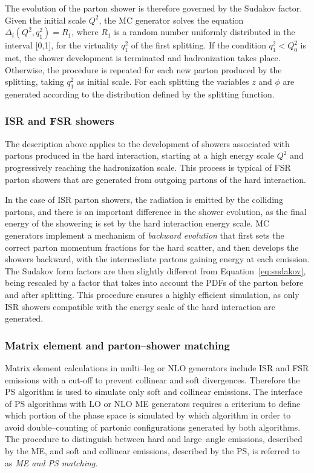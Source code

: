 The evolution of the parton shower is therefore governed by the
Sudakov factor. Given the initial scale $Q^2$, the MC generator solves
the equation $\Delta_i(Q^2, q_1^2)=R_1$, where $R_1$ is a random
number uniformly distributed in the interval [0,1], for the virtuality $q_1^2$ of
the first splitting. If the condition $q_1^2<Q_0^2$ is met, the shower
development is terminated and hadronization takes place. Otherwise,
the procedure is repeated for each new parton produced by the
splitting, taking $q_1^2$ as initial scale.
For each splitting the variables $z$ and $\phi$ are generated
according to the distribution defined by the splitting function.

\subsubsection{ISR and FSR showers}
\label{sec:isrfsr}

The description above applies to the development of showers
associated with partons produced in the hard interaction, starting at
a high energy scale $Q^2$ and progressively reaching the hadronization
scale. This process is typical of FSR parton showers that are
generated from outgoing partons of the hard interaction.

In the case of ISR parton showers, the radiation is emitted by the
colliding partons, and there is an important difference in the shower
evolution, as the final energy of the showering is set by the hard
interaction energy scale.
MC generators implement a mechanism of {\it backward evolution} that
first sets the correct parton momentum fractions for the hard scatter,
and then develops the showers backward, with the intermediate partons
gaining energy at each emission. The Sudakov form factors are then
slightly different from Equation~\ref{eq:sudakov}, being rescaled by a
factor that takes into account the PDFs of the parton before and after
splitting. This procedure ensures a highly efficient simulation, as
only ISR showers compatible with the energy scale of the hard
interaction are generated. 

\subsubsection{Matrix element and parton--shower matching}
\label{sec:matching}
 
Matrix element calculations in multi--leg or NLO generators include
ISR and FSR emissions with a cut-off to prevent collinear
and soft divergences. Therefore the PS algorithm is used to simulate
only soft and collinear emissions.
The interface of PS algorithms with LO or NLO ME generators requires a
criterium to define which portion of the phase space is simulated by
which algorithm in order to avoid double--counting of partonic
configurations generated by both algorithms. The procedure to
distinguish between hard and large--angle emissions, described by the
ME, and soft and collinear emissions, described by the PS, is referred
to as {\it ME and PS matching}. 

